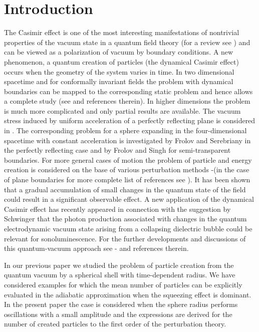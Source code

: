 \documentclass[a4paper,11pt]{article}
\begin{document}
\section{Introduction}
   The Casimir effect is one of the most interesting manifestations
  of nontrivial properties of the vacuum state in a quantum field
  theory (for a review see \cite{mueller,Moste,Milt,Birrell}) and
   can be viewed
  as a polarization of
  vacuum by boundary conditions. A new phenomenon, a
  quantum creation of particles (the dynamical Casimir effect)
  occurs when the geometry of the system varies in time. In two
  dimensional spacetime and for conformally invariant fields the
  problem with dynamical boundaries can be mapped to the
  corresponding static problem and hence allows a complete study
  (see \cite{Moste,Birrell} and references therein). In higher
  dimensions the problem is much more complicated and only
  partial results are available. The vacuum stress induced by uniform
  acceleration of a perfectly reflecting plane is considered in
  \cite{Cand}. The corresponding problem for a sphere
  expanding in the four-dimensional spacetime with constant
  acceleration is investigated by Frolov and Serebriany
  \cite{Frol1,Frol2} in the perfectly reflecting case and by Frolov
  and Singh \cite{Frol3} for semi-transparent boundaries. For more
  general cases of motion the problem of particle and
  energy creation is considered on the base of various
  perturbation methods
\cite{Ford}-\cite{Ander}(in the case of plane boundaries for more
  complete list of references see \cite{dod1}).
   It has been
  shown that a gradual accumulation of small changes in the quantum
  state of the field could result in a significant observable
  effect. A new application of the dynamical Casimir effect has
  recently appeared in connection with the suggestion by Schwinger
  \cite{Schwing} that the photon production associated with changes in
  the quantum electrodynamic vacuum state arising from a
  collapsing dielectric bubble could be relevant for
  sonoluminescence.
  For the further developments and discussions of this quantum-vacuum
  approach see \cite{Eber}-\cite{Liber2} and references
  therein.

In our previous paper \cite{set} we studied the problem of
particle creation from the quantum vacuum by a spherical shell
with time-dependent radius. We have considered examples for which
the mean number of particles can be explicitly evaluated in the
adiabatic approximation when the squeezing effect is dominant. In
the present paper the case is considered when the sphere radius
performs oscillations with a small amplitude and the expressions
are derived for the number of created particles to the first order
of the perturbation theory.
\end{document}
